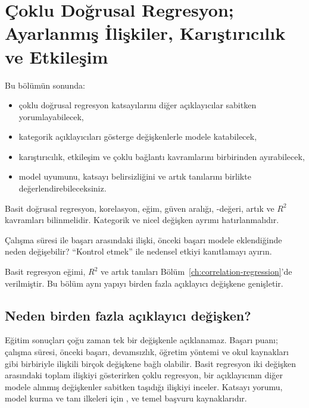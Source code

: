 \chapter{Çoklu Doğrusal Regresyon; Ayarlanmış İlişkiler, Karıştırıcılık ve Etkileşim}
\label{ch:multiple-regression}

\begin{hedefler}
Bu bölümün sonunda:
\begin{itemize}
  \item çoklu doğrusal regresyon katsayılarını diğer açıklayıcılar sabitken yorumlayabilecek,
  \item kategorik açıklayıcıları gösterge değişkenlerle modele katabilecek,
  \item karıştırıcılık, etkileşim ve çoklu bağlantı kavramlarını birbirinden ayırabilecek,
  \item model uyumunu, katsayı belirsizliğini ve artık tanılarını birlikte değerlendirebileceksiniz.
\end{itemize}
\end{hedefler}

\begin{prerequisitebox}
Basit doğrusal regresyon, korelasyon, eğim, güven aralığı, \pval-değeri, artık ve
$R^2$ kavramları bilinmelidir. Kategorik ve nicel değişken ayrımı
hatırlanmalıdır.
\end{prerequisitebox}

\begin{hazirlik}
Çalışma süresi ile başarı arasındaki ilişki, önceki başarı modele eklendiğinde
neden değişebilir? ``Kontrol etmek'' ile nedensel etkiyi kanıtlamayı ayırın.
\end{hazirlik}

Basit regresyon eğimi, $R^2$ ve artık tanıları Bölüm~\ref{ch:correlation-regression}'de
verilmiştir. Bu bölüm aynı yapıyı birden fazla açıklayıcı değişkene genişletir.

\section{Neden birden fazla açıklayıcı değişken?}

Eğitim sonuçları çoğu zaman tek bir değişkenle açıklanamaz. Başarı puanı;
çalışma süresi, önceki başarı, devamsızlık, öğretim yöntemi ve okul kaynakları
gibi birbiriyle ilişkili birçok değişkene bağlı olabilir. Basit regresyon iki
değişken arasındaki toplam ilişkiyi gösterirken çoklu regresyon, bir
açıklayıcının diğer modele alınmış değişkenler sabitken taşıdığı ilişkiyi
inceler. Katsayı yorumu, model kurma ve tanı ilkeleri için
\citet{gelman2020}, \citet{fox2016} ve \citet{james2021} temel başvuru
kaynaklarıdır.


